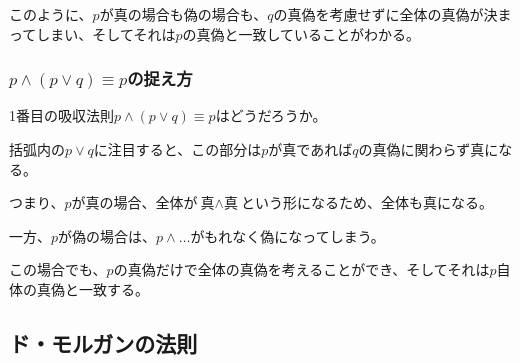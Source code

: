 \documentclass[../../imaging-math]{subfiles}
\begin{document}
\br

このように、$p$が真の場合も偽の場合も、$q$の真偽を考慮せずに全体の真偽が決まってしまい、そしてそれは$p$の真偽と一致していることがわかる。

\subsubsection{$p \land (p \lor q) \equiv p$の捉え方}

1番目の吸収法則$p \land (p \lor q) \equiv p$はどうだろうか。

\br

\begin{tcolorbox}[empty, size=minimal, sidebyside, righthand ratio=0.35]
  括弧内の$p \lor q$に注目すると、この部分は$p$が真であれば$q$の真偽に関わらず真になる。

  つまり、$p$が真の場合、全体が$\text{真} \land \text{真}$という形になるため、全体も真になる。

  \br

  一方、$p$が偽の場合は、$p \land \ldots$がもれなく偽になってしまう。

  \tcblower

  \centering
\end{tcolorbox}

\br

この場合でも、$p$の真偽だけで全体の真偽を考えることができ、そしてそれは$p$自体の真偽と一致する。

\subsection{ド・モルガンの法則}
\end{document}
